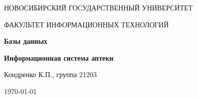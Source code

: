 \begin{titlepage}
	\centering
	{\LARGE \textsc{НОВОСИБИРСКИЙ ГОСУДАРСТВЕННЫЙ УНИВЕРСИТЕТ}\par}
	{\textsc{ФАКУЛЬТЕТ ИНФОРМАЦИОННЫХ ТЕХНОЛОГИЙ}\par}
	
	\vspace{3cm}
	
	{\huge\bfseries Базы данных\par}
	
	\vspace{1cm}
	
	{\Large\bfseries Информационная система аптеки\par}
	
	\vspace{10cm}
	
	\begin{flushright}
		Кондренко К.П., группа 21203
	\end{flushright}
	
	\vfill
	
	{\large \today\par}
\end{titlepage}
